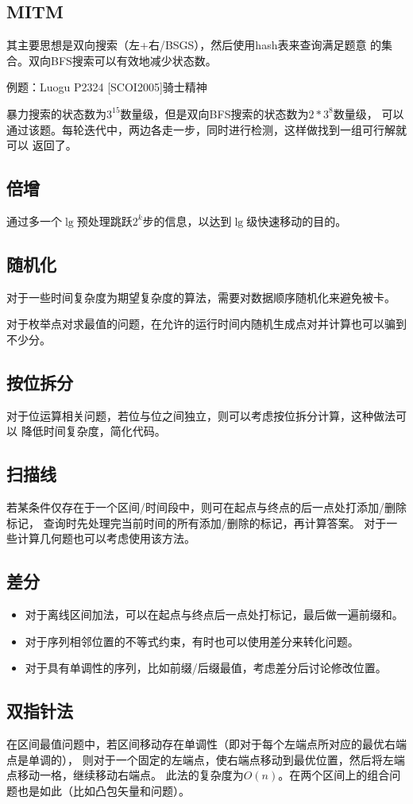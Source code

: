 \subsection{MITM}
其主要思想是双向搜索（左+右/BSGS），然后使用hash表来查询满足题意
的集合。双向BFS搜索可以有效地减少状态数。

例题：Luogu P2324 [SCOI2005]骑士精神

暴力搜索的状态数为$3^{15}$数量级，但是双向BFS搜索的状态数为$2*3^8$数量级，
可以通过该题。每轮迭代中，两边各走一步，同时进行检测，这样做找到一组可行解就可以
返回了。


\subsection{倍增}
通过多一个$\lg$预处理跳跃$2^k$步的信息，以达到$\lg$级快速移动的目的。
\subsection{随机化}
对于一些时间复杂度为期望复杂度的算法，需要对数据顺序随机化来避免被卡。

对于枚举点对求最值的问题，在允许的运行时间内随机生成点对并计算也可以骗到不少分。
\subsection{按位拆分}
对于位运算相关问题，若位与位之间独立，则可以考虑按位拆分计算，这种做法可以
降低时间复杂度，简化代码。
\subsection{扫描线}
若某条件仅存在于一个区间/时间段中，则可在起点与终点的后一点处打添加/删除标记，
查询时先处理完当前时间的所有添加/删除的标记，再计算答案。
对于一些计算几何题也可以考虑使用该方法。
\subsection{差分}
\begin{itemize}
	\item 对于离线区间加法，可以在起点与终点后一点处打标记，最后做一遍前缀和。
	\item 对于序列相邻位置的不等式约束，有时也可以使用差分来转化问题。
	\item 对于具有单调性的序列，比如前缀/后缀最值，考虑差分后讨论修改位置。
\end{itemize}
\subsection{双指针法}
在区间最值问题中，若区间移动存在单调性（即对于每个左端点所对应的最优右端点是单调的），
则对于一个固定的左端点，使右端点移动到最优位置，然后将左端点移动一格，继续移动右端点。
此法的复杂度为$O(n)$。在两个区间上的组合问题也是如此（比如凸包矢量和问题）。
